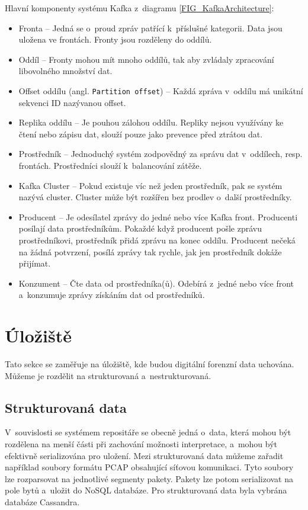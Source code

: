 \vspace{0.5cm}
\noindent Hlavní komponenty systému Kafka z~diagramu \ref{FIG_KafkaArchitecture}:
\begin{itemize}
    \item Fronta -- Jedná se o~proud zpráv patřící k~příslušné kategorii. Data jsou uložena ve frontách. Fronty jsou rozděleny do oddílů.
    
    \item Oddíl -- Fronty mohou mít mnoho oddílů, tak aby zvládaly zpracování libovolného množství dat.

    \item Offset oddílu (angl. \texttt{Partition offset}) -- Každá zpráva v~oddílu má unikátní sekvenci ID nazývanou offset.

    \item Replika oddílu -- Je pouhou zálohou oddílu. Repliky nejsou využívány ke čtení nebo zápisu dat, slouží pouze jako prevence před ztrátou dat.
    
    \item Prostředník -- Jednoduchý systém zodpovědný za správu dat v~oddílech, resp. frontách. Prostředníci slouží k~balancování zátěže.
    
    \item Kafka Cluster -- Pokud existuje víc než jeden prostředník, pak se systém nazývá cluster. Cluster může být rozšířen bez prodlev o~další prostředníky.
    
    \item Producent -- Je odesílatel zprávy do jedné nebo více Kafka front. Producenti posílají data prostředníkům. Pokaždé když producent pošle zprávu prostředníkovi, prostředník přidá zprávu na konec oddílu. Producent nečeká na žádná potvrzení, posílá zprávy tak rychle, jak jen prostředník dokáže přijímat.
    
    \item Konzument -- Čte data od prostředníka(ů). Odebírá z~jedné nebo více front a~konzumuje zprávy získáním dat od prostředníků.
\end{itemize}

\section{Úložiště}
Tato sekce se zaměřuje na úložiště, kde budou digitální forenzní data uchována. Můžeme je rozdělit na strukturovaná a~nestrukturovaná.

\subsection{Strukturovaná data}
V~souvislosti se systémem repositáře se obecně jedná o~data, která mohou být rozdělena na menší části při zachování možnosti interpretace, a~mohou být efektivně serializována pro uložení. Mezi strukturovaná data můžeme zařadit například soubory formátu PCAP obsahující síťovou komunikaci. Tyto soubory lze rozparsovat na jednotlivé segmenty pakety. Pakety lze potom serializovat na pole bytů a~uložit do NoSQL databáze. Pro strukturovaná data byla vybrána databáze Cassandra.

